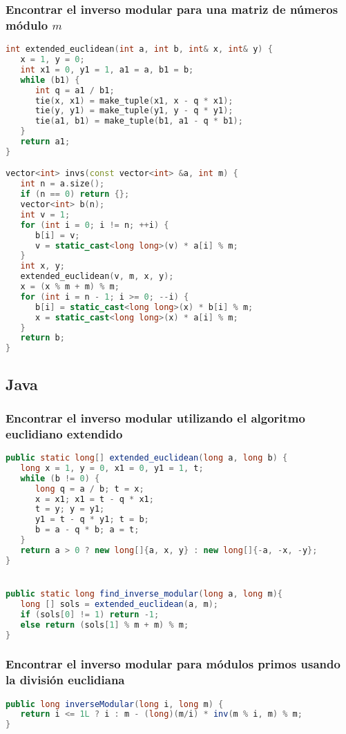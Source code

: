 \subsubsection{Encontrar el inverso modular para una matriz de números módulo $m$}
\begin{lstlisting}[language=C++]
int extended_euclidean(int a, int b, int& x, int& y) {
   x = 1, y = 0;
   int x1 = 0, y1 = 1, a1 = a, b1 = b;
   while (b1) {
      int q = a1 / b1;
      tie(x, x1) = make_tuple(x1, x - q * x1);
      tie(y, y1) = make_tuple(y1, y - q * y1);
      tie(a1, b1) = make_tuple(b1, a1 - q * b1);
   }
   return a1;
}

vector<int> invs(const vector<int> &a, int m) {
   int n = a.size();
   if (n == 0) return {};
   vector<int> b(n);
   int v = 1;
   for (int i = 0; i != n; ++i) {
      b[i] = v;
      v = static_cast<long long>(v) * a[i] % m;
   }
   int x, y;
   extended_euclidean(v, m, x, y);
   x = (x % m + m) % m;
   for (int i = n - 1; i >= 0; --i) {
      b[i] = static_cast<long long>(x) * b[i] % m;
      x = static_cast<long long>(x) * a[i] % m;
   }
   return b;
}
\end{lstlisting}

\subsection{Java}

\subsubsection{Encontrar el inverso modular utilizando el algoritmo euclidiano extendido}
\begin{lstlisting}[language=Java]
public static long[] extended_euclidean(long a, long b) {
   long x = 1, y = 0, x1 = 0, y1 = 1, t;
   while (b != 0) {
      long q = a / b; t = x;
      x = x1; x1 = t - q * x1;
      t = y; y = y1;
      y1 = t - q * y1; t = b;
      b = a - q * b; a = t;
   }
   return a > 0 ? new long[]{a, x, y} : new long[]{-a, -x, -y};
}


public static long find_inverse_modular(long a, long m){
   long [] sols = extended_euclidean(a, m);
   if (sols[0] != 1) return -1;
   else return (sols[1] % m + m) % m;
}
\end{lstlisting}

\subsubsection{Encontrar el inverso modular para módulos primos usando la división euclidiana}
\begin{lstlisting}[language=Java]
public long inverseModular(long i, long m) {
   return i <= 1L ? i : m - (long)(m/i) * inv(m % i, m) % m;
}
\end{lstlisting}

